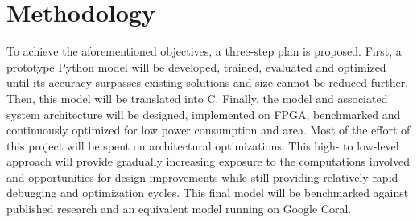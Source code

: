 \documentclass[12pt]{article}
\begin{document}
\section{Methodology}
To achieve the aforementioned objectives, a three-step plan is proposed. First, a prototype Python model will be developed, trained, evaluated and optimized until its accuracy surpasses existing solutions and size cannot be reduced further. Then, this model will be translated into C.
Finally, the model and associated system architecture will be designed, implemented on FPGA, benchmarked and continuously optimized for low power consumption and area.
Most of the effort of this project will be spent on architectural optimizations. This high- to low-level approach will provide gradually increasing exposure to the computations involved and opportunities for design improvements while still providing relatively rapid debugging and optimization cycles.
This final model will be benchmarked against published research and an equivalent model running on Google Coral.

\newpage
\printbibliography
\end{document}
